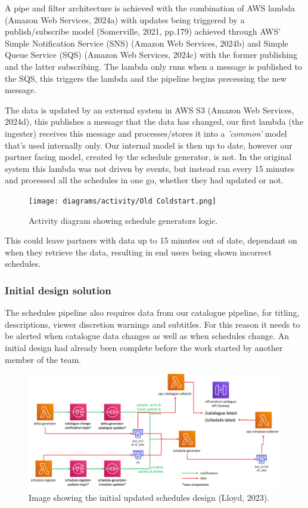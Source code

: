   A pipe and filter architecture is achieved with the combination of AWS lambda (Amazon Web Services, 2024a) with updates being triggered by a publish/subscribe 
  model (Somerville, 2021, pp.179) achieved through AWS' Simple Notification Service (SNS) (Amazon Web Services, 2024b) and Simple Queue Service (SQS) 
  (Amazon Web Services, 2024c) with the former publishing and the latter subscribing. The lambda only runs when a message is published to the SQS, this triggers 
  the lambda and the pipeline begins precessing the new message.

  The data is updated by an external system in AWS S3 (Amazon Web Services, 2024d), this publishes a message that the data has changed, our first lambda 
  (the ingester) receives this message and processes/stores it into a \textit{'common'} model that's used internally only. Our internal model is then up to date,
  however our partner facing model, created by the schedule generator, is not. In the original system this lambda was not driven by events, but instead ran every
  15 minutes and processed all the schedules in one go, whether they had updated or not. 
  
  \begin{figure}[H]
    \centering
    \texttt{[image: diagrams/activity/Old Coldstart.png]}
    \caption{Activity diagram showing schedule generators logic.}
    \label{fig:oldColdstart}
  \end{figure}

  This could leave partners with data up to 15 minutes out of date, dependant on when they retrieve the data, resulting in end users being shown incorrect
  schedules. 

    \subsubsection{Initial design solution}
    The schedules pipeline also requires data from our catalogue pipeline, for titling, descriptions, viewer discretion warnings and subtitles. For this 
    reason it needs to be alerted when catalogue data changes as well as when schedules change. An initial design had already been complete before the work 
    started by another member of the team.

    \begin{figure}[H]
      \centering
      \includegraphics[width=12cm]{assets/initialDesign/architecture.png}
      \caption{Image showing the initial updated schedules design (Lloyd, 2023).}
      \label{fig:initialDesign}
    \end{figure}


